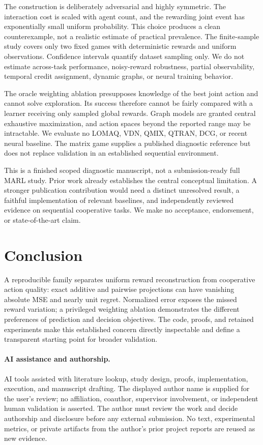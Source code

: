 \documentclass[10pt]{article}
\begin{document}
The construction is deliberately adversarial and highly symmetric. The interaction cost is scaled with agent count, and the rewarding joint event has exponentially small uniform probability. This choice produces a clean counterexample, not a realistic estimate of practical prevalence. The finite-sample study covers only two fixed games with deterministic rewards and uniform observations. Confidence intervals quantify dataset sampling only. We do not estimate across-task performance, noisy-reward robustness, partial observability, temporal credit assignment, dynamic graphs, or neural training behavior.

The oracle weighting ablation presupposes knowledge of the best joint action and cannot solve exploration. Its success therefore cannot be fairly compared with a learner receiving only sampled global rewards. Graph models are granted central exhaustive maximization, and action spaces beyond the reported range may be intractable. We evaluate no LOMAQ, VDN, QMIX, QTRAN, DCG, or recent neural baseline. The matrix game supplies a published diagnostic reference but does not replace validation in an established sequential environment.

This is a finished scoped diagnostic manuscript, not a submission-ready full MARL study. Prior work already establishes the central conceptual limitation. A stronger publication contribution would need a distinct unresolved result, a faithful implementation of relevant baselines, and independently reviewed evidence on sequential cooperative tasks. We make no acceptance, endorsement, or state-of-the-art claim.

\section{Conclusion}
A reproducible family separates uniform reward reconstruction from cooperative action quality: exact additive and pairwise projections can have vanishing absolute MSE and nearly unit regret. Normalized error exposes the missed reward variation; a privileged weighting ablation demonstrates the different preferences of prediction and decision objectives. The code, proofs, and retained experiments make this established concern directly inspectable and define a transparent starting point for broader validation.

\paragraph{AI assistance and authorship.}
AI tools assisted with literature lookup, study design, proofs, implementation, execution, and manuscript drafting. The displayed author name is supplied for the user's review; no affiliation, coauthor, supervisor involvement, or independent human validation is asserted. The author must review the work and decide authorship and disclosure before any external submission. No text, experimental metrics, or private artifacts from the author's prior project reports are reused as new evidence.
\end{document}
